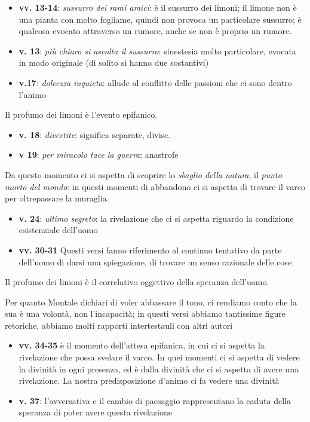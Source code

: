 \documentclass[a4paper, twoside, titlepage]{book}
\newcommand{\elenco}[1]{%
\begin{itemize}
#1
\end{itemize}}
\begin{document}
\elenco{\item \textbf{vv. 13-14}: \textit{sussurro dei rami amici}: è il sussurro dei limoni; il limone non è una pianta con molto fogliame, quindi non provoca un particolare sussurro; è qualcosa evocato attraverso un rumore, anche se non è proprio un rumore.\item \textbf{v. 13}: \textit{più chiaro si ascolta il sussurro}: sinestesia molto particolare, evocata in modo originale (di solito si hanno due sostantivi)\item \textbf{v.17}: \textit{dolcezza inquieta}: allude al conflitto delle passioni che ci sono dentro l'animo}

Il profumo dei limoni è l'evento epifanico. 

\elenco{\item \textbf{v. 18}: \textit{divertite}: significa separate, divise. \item \textbf{v 19}: \textit{per miracolo tace la guerra}: anastrofe}


Da questo momento ci si aspetta di scoprire lo \textit{sbaglio della natura}, il \textit{punto morto del mondo}: in questi momenti di abbandono ci si aspetta di trovare il varco per oltrepassare la muraglia.

\elenco{\item \textbf{v. 24}: \textit{ultimo segreto}: la rivelazione che ci si aspetta riguardo la condizione esistenziale dell'uomo\item \textbf{vv. 30-31} Questi versi fanno riferimento al continuo tentativo da parte dell'uomo di darsi una spiegazione, di trovare un senso razionale delle cose}

Il profumo dei limoni è il correlativo oggettivo della speranza dell'uomo.

Per quanto Montale dichiari di voler abbassare il tono, ci rendiamo conto che la sua è una volontà, non l'incapacità; in questi versi abbiamo tantissime figure retoriche, abbiamo molti rapporti intertestauli con altri autori

\elenco{\item \textbf{vv. 34-35} è il momento dell'attesa epifanica, in cui ci si aspetta la rivelazione che possa svelare il varco. In quei momenti ci si aspetta di vedere la divinità in ogni presenza, ed è dalla divinità che ci si aspetta di avere una rivelazione. La nostra predisposizione d'animo ci fa vedere una divinità\item \textbf{v. 37}: l'avversativa e il cambio di paesaggio rappresentano la caduta della speranza di poter avere questa rivelazione}
\end{document}
